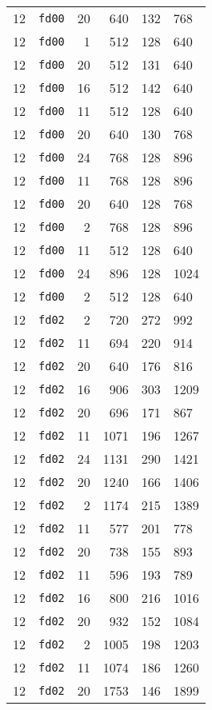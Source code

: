 \documentclass{article}
\begin{document}
\begin{table}[h!]
\begin{tabular}{llrrrl}
    12 & \texttt{fd00} & 20 & 640 & 132 & 768 \\
    12 & \texttt{fd00} & 1 & 512 & 128 & 640 \\
    12 & \texttt{fd00} & 20 & 512 & 131 & 640 \\
    12 & \texttt{fd00} & 16 & 512 & 142 & 640 \\
    12 & \texttt{fd00} & 11 & 512 & 128 & 640 \\
    12 & \texttt{fd00} & 20 & 640 & 130 & 768 \\
    12 & \texttt{fd00} & 24 & 768 & 128 & 896 \\
    12 & \texttt{fd00} & 11 & 768 & 128 & 896 \\
    12 & \texttt{fd00} & 20 & 640 & 128 & 768 \\
    12 & \texttt{fd00} & 2 & 768 & 128 & 896 \\
    12 & \texttt{fd00} & 11 & 512 & 128 & 640 \\
    12 & \texttt{fd00} & 24 & 896 & 128 & 1024 \\
    12 & \texttt{fd00} & 2 & 512 & 128 & 640 \\
    12 & \texttt{fd02} & 2 & 720 & 272 & 992 \\
    12 & \texttt{fd02} & 11 & 694 & 220 & 914 \\
    12 & \texttt{fd02} & 20 & 640 & 176 & 816 \\
    12 & \texttt{fd02} & 16 & 906 & 303 & 1209 \\
    12 & \texttt{fd02} & 20 & 696 & 171 & 867 \\
    12 & \texttt{fd02} & 11 & 1071 & 196 & 1267 \\
    12 & \texttt{fd02} & 24 & 1131 & 290 & 1421 \\
    12 & \texttt{fd02} & 20 & 1240 & 166 & 1406 \\
    12 & \texttt{fd02} & 2 & 1174 & 215 & 1389 \\
    12 & \texttt{fd02} & 11 & 577 & 201 & 778 \\
    12 & \texttt{fd02} & 20 & 738 & 155 & 893 \\
    12 & \texttt{fd02} & 11 & 596 & 193 & 789 \\
    12 & \texttt{fd02} & 16 & 800 & 216 & 1016 \\
    12 & \texttt{fd02} & 20 & 932 & 152 & 1084 \\
    12 & \texttt{fd02} & 2 & 1005 & 198 & 1203 \\
    12 & \texttt{fd02} & 11 & 1074 & 186 & 1260 \\
    12 & \texttt{fd02} & 20 & 1753 & 146 & 1899 \\

\end{tabular}
\end{table}
\end{document}
